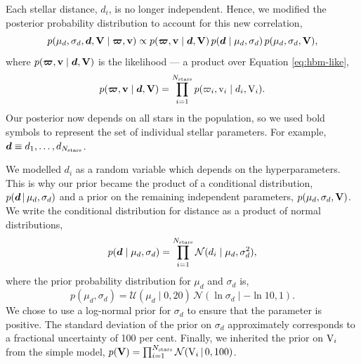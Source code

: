 Each stellar distance, \(d_i\), is no longer independent. Hence, we modified the posterior probability distribution to account for this new correlation,
%
\begin{equation}
    p(\mu_d, \sigma_d, \bm{d}, \bm{\mathrm{V}} \mid \bm{\varpi}, \bm{\mathrm{v}}) \propto p(\bm{\varpi}, \bm{\mathrm{v}} \mid \bm{d}, \bm{\mathrm{V}}) \, p(\bm{d} \mid \mu_d, \sigma_d) \, p(\mu_d, \sigma_d, \bm{\mathrm{V}}),
\end{equation}
%
where \(p(\bm{\varpi}, \bm{\mathrm{v}} \mid \bm{d}, \bm{\mathrm{V}})\) is the likelihood --- a product over Equation \ref{eq:hbm-like},
%
\begin{equation}
    p(\bm{\varpi}, \bm{\mathrm{v}} \mid \bm{d}, \bm{\mathrm{V}}) = \prod_{i=1}^{N_\mathrm{stars}} p(\varpi_i, \mathrm{v}_i \mid d_i, \mathrm{V}_i).
\end{equation}
%
Our posterior now depends on all stars in the population, so we used bold symbols to represent the set of individual stellar parameters. For example, \(\bm{d} \equiv d_1, \dots, d_{N_\mathrm{stars}}\).

We modelled \(d_i\) as a random variable which depends on the hyperparameters. This is why our prior became the product of a conditional distribution, \(p(\bm{d} \,|\, \mu_d, \sigma_d)\) and a prior on the remaining independent parameters, \(p(\mu_d, \sigma_d, \bm{\mathrm{V}})\). We write the conditional distribution for distance as a product of normal distributions,
%
\begin{equation}
    p(\bm{d} \mid \mu_d, \sigma_d) = \prod_{i=1}^{N_\mathrm{stars}} \mathcal{N}(d_i \mid \mu_d, \sigma_d^2),
\end{equation}
%
where the prior probability distribution for \(\mu_d\) and \(\sigma_d\) is,
%
\begin{equation}
    p(\mu_d, \sigma_d) = \mathcal{U}(\mu_d \mid 0, 20) \, \mathcal{N}(\ln\sigma_d \mid - \ln 10, 1).
\end{equation}
%
We chose to use a log-normal prior for \(\sigma_d\) to ensure that the parameter is positive. The standard deviation of the prior on \(\sigma_d\) approximately corresponds to a fractional uncertainty of 100 per cent. Finally, we inherited the prior on \(\mathrm{V}_i\) from the simple model, \(p(\bm{\mathrm{V}}) = \prod_{i=1}^{N_\mathrm{stars}} \mathcal{N}(\mathrm{V}_i \,|\, 0, 100)\).

